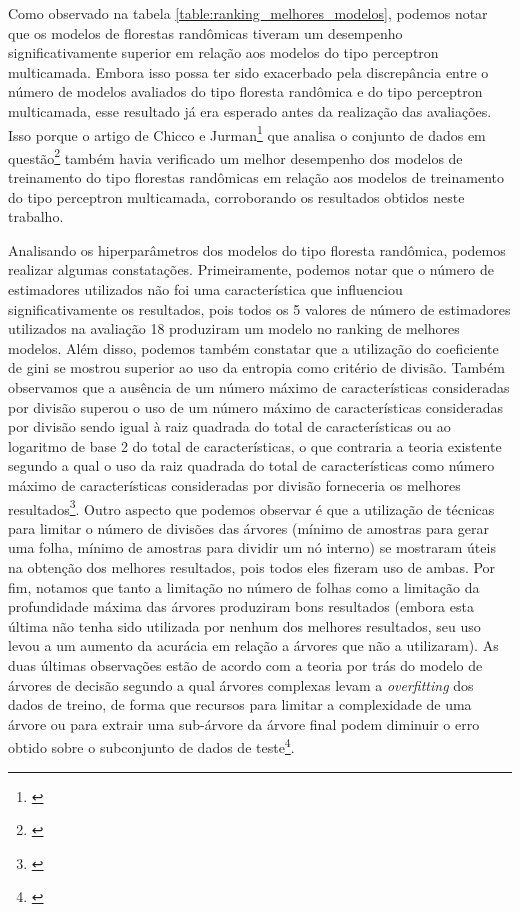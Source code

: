 Como observado na tabela \ref{table:ranking_melhores_modelos}, podemos notar que os modelos de florestas randômicas tiveram um desempenho significativamente superior em relação aos modelos do tipo perceptron multicamada. Embora isso possa ter sido exacerbado pela discrepância entre o número de modelos avaliados do tipo floresta randômica e do tipo perceptron multicamada, esse resultado já era esperado antes da realização das avaliações. Isso porque o artigo de Chicco e Jurman\footnote{\cite{chicco2020}} que analisa o conjunto de dados em questão\footnote{\cite{larxel_dataset}} também havia verificado um melhor desempenho dos modelos de treinamento do tipo florestas randômicas em relação aos modelos de treinamento do tipo perceptron multicamada, corroborando os resultados obtidos neste trabalho.

Analisando os hiperparâmetros dos modelos do tipo floresta randômica, podemos realizar algumas constatações. Primeiramente, podemos notar que o número de estimadores utilizados não foi uma característica que influenciou significativamente os resultados, pois todos os 5 valores de número de estimadores utilizados na avaliação 18 produziram um modelo no ranking de melhores modelos. Além disso, podemos também constatar que a utilização do coeficiente de gini se mostrou superior ao uso da entropia como critério de divisão. Também observamos que a ausência de um número máximo de características consideradas por divisão superou o uso de um número máximo de características consideradas por divisão sendo igual à raiz quadrada do total de características ou ao logaritmo de base 2 do total de características, o que contraria a teoria existente segundo a qual o uso da raiz quadrada do total de características como número máximo de características consideradas por divisão forneceria os melhores resultados\footnote{\cite[p.319-321]{statistical_learning}}. Outro aspecto que podemos observar é que a utilização de técnicas para limitar o número de divisões das árvores (mínimo de amostras para gerar uma folha, mínimo de amostras para dividir um nó interno) se mostraram úteis na obtenção dos melhores resultados, pois todos eles fizeram uso de ambas. Por fim, notamos que tanto a limitação no número de folhas como a limitação da profundidade máxima das árvores produziram bons resultados (embora esta última não tenha sido utilizada por nenhum dos melhores resultados, seu uso levou a um aumento da acurácia em relação a árvores que não a utilizaram). As duas últimas observações estão de acordo com a teoria por trás do modelo de árvores de decisão segundo a qual árvores complexas levam a \textit{overfitting} dos dados de treino, de forma que recursos para limitar a complexidade de uma árvore ou para extrair uma sub-árvore da árvore final podem diminuir o erro obtido sobre o subconjunto de dados de teste\footnote{\cite[p.307-311]{statistical_learning}}.

